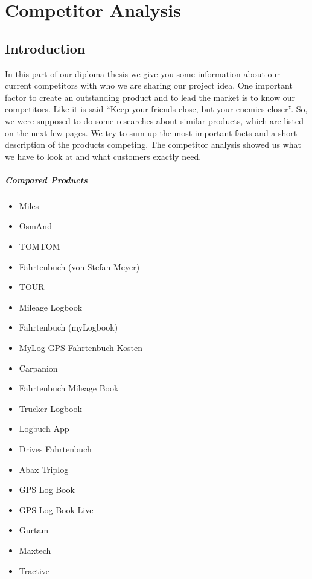 \chapter{Competitor Analysis}
\section{Introduction}
In this part of our diploma thesis we give you some information about our current competitors with who we are sharing our project idea.
\newline \newline
One important factor to create an outstanding product and to lead the market is to know our competitors. Like it is said “Keep your friends close, but your enemies closer”. So,  we were supposed to do some researches about similar products, which are listed on the next few pages. We try to sum up the most important facts and a short description of the products competing. 
\newline \newline
The competitor analysis showed us what we have to look at and what customers exactly need. 
\paragraph{Compared Products}
\begin{itemize}
\item Miles
\item OsmAnd
\item TOMTOM
\item Fahrtenbuch (von Stefan Meyer)
\item TOUR
\item Mileage Logbook
\item Fahrtenbuch (myLogbook)
\item MyLog GPS Fahrtenbuch Kosten
\item Carpanion
\item Fahrtenbuch Mileage Book
\item Trucker Logbook
\item Logbuch App
\item Drives Fahrtenbuch
\item Abax Triplog
\item GPS Log Book
\item GPS Log Book Live
\item Gurtam
\item Maxtech
\item Tractive
\end{itemize}
\newpage

